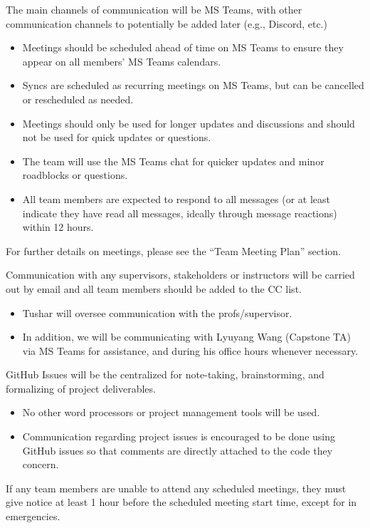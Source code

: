 \documentclass{article}
\begin{document}
\begin{itemize}
\begin{item}
The main channels of communication will be MS Teams, with other communication channels to potentially be added later (e.g., Discord, etc.)
\begin{itemize}
\item Meetings should be scheduled ahead of time on MS Teams to ensure they appear on all members' MS Teams calendars.
\item Syncs are scheduled as recurring meetings on MS Teams, but can be cancelled or rescheduled as needed.
\item Meetings should only be used for longer updates and discussions and should not be used for quick updates or questions.
\item The team will use the MS Teams chat for quicker updates and minor roadblocks or questions.
\item All team members are expected to respond to all messages (or at least indicate they have read all messages, ideally through message reactions) within 12 hours.
\end{itemize}
\end{item}
\end{itemize}

For further details on meetings, please see the ``Team Meeting Plan'' section.

\begin{itemize}
\begin{item}
Communication with any supervisors, stakeholders or instructors will be carried out by email and all team members should be added to the CC list.
\begin{itemize}
\item Tushar will oversee communication with the profs/supervisor.
\item In addition, we will be communicating with Lyuyang Wang (Capstone TA) via MS Teams for assistance, and during his office hours whenever necessary.
\end{itemize}
\end{item}
\begin{item}
GitHub Issues will be the centralized for note-taking, brainstorming, and formalizing of project deliverables.
\begin{itemize}
\item No other word processors or project management tools will be used.
\item Communication regarding project issues is encouraged to be done using GitHub issues so that comments are directly attached to the code they concern.
\end{itemize}
\end{item}
\begin{item}
If any team members are unable to attend any scheduled meetings, they must give notice at least 1 hour before the scheduled meeting start time, except for in emergencies.
\end{item}
\end{itemize}
\end{document}
